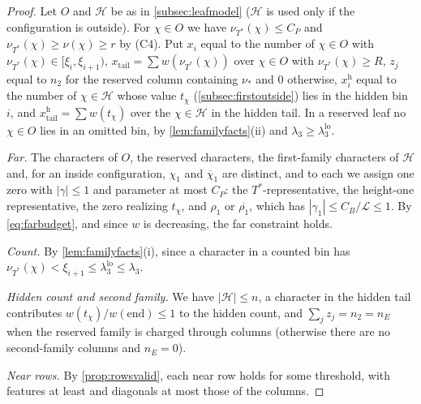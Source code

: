 \documentclass[11pt]{amsart}
\numberwithin{equation}{section}
\theoremstyle{plain}
\theoremstyle{definition}
\theoremstyle{remark}
\newcommand{\LL}{\mathcal{L}}
\newcommand{\lo}{\mathrm{lo}}
\newcommand{\1}{\mathbf{1}}
\newcommand{\bchi}{\overline{\chi}}
\begin{document}
\begin{proof}
Let $O$ and $\mathcal H$ be as in \cref{subsec:leafmodel} ($\mathcal H$ is used only if the
configuration is outside). For
$\chi\in O$ we have $\nu_{T^*}(\chi)\le C_P$ and $\nu_{T^*}(\chi)\ge\nu(\chi)\ge r$ by (C4). Put $x_i$
equal to the number of $\chi\in O$ with $\nu_{T^*}(\chi)\in[\xi_i,\xi_{i+1})$, $x_{\mathrm{tail}}=\sum w(\nu_{T^*}(\chi))$
over $\chi\in O$ with $\nu_{T^*}(\chi)\ge R$, $z_j$ equal to $n_2$ for the reserved column containing
$\nu_*$ and $0$ otherwise, $x^{\mathrm h}_i$ equal to the number of $\chi\in\mathcal H$ whose value $t_\chi$
(\cref{subsec:firstoutside}) lies in the hidden bin $i$, and $x^{\mathrm h}_{\mathrm{tail}}=\sum w(t_\chi)$ over the
$\chi\in\mathcal H$ in the hidden tail. In a reserved leaf no $\chi\in O$ lies in an omitted bin, by \cref{lem:familyfacts}(ii) and
$\lambda_3\ge\lambda_3^{\lo}$.

\emph{Far.} The characters of $O$, the reserved characters, the first-family characters of $\mathcal
H$ and, for an inside configuration, $\chi_1$ and $\bchi_1$ are distinct, and to each we assign one
zero with $|\gamma|\le1$ and parameter at most $C_P$: the $T^*$-representative, the height-one
representative, the zero realizing $t_\chi$, and $\rho_1$ or $\overline{\rho_1}$, which has
$|\gamma_1|\le C_B/\LL\le1$. By \eqref{eq:farbudget}, and since $w$ is decreasing, the far
constraint holds.

\emph{Count.} By \cref{lem:familyfacts}(i), since a character in a counted bin has
$\nu_{T^*}(\chi)<\xi_{i+1}\le\lambda_3^{\lo}\le\lambda_3$.

\emph{Hidden count and second family.} We have $|\mathcal H|\le n$, a character in the hidden
tail contributes $w(t_\chi)/w(\mathrm{end})\le1$ to the hidden count, and $\sum_jz_j=n_2=n_E$ when the reserved
family is charged through columns (otherwise there are no second-family columns and $n_E=0$).

\emph{Near rows.} By \cref{prop:rowsvalid}, each near row holds for some threshold, with features at
least and diagonals at most those of the columns.


\end{proof}
\end{document}
